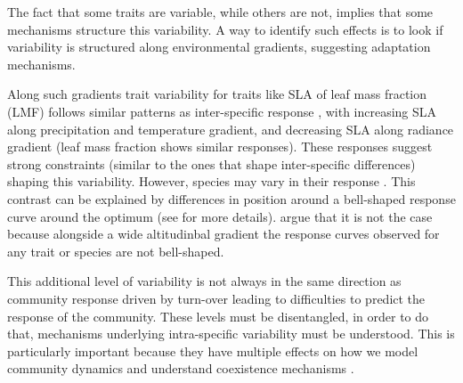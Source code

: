 {%




The fact that some traits are variable, while others are not, implies that some mechanisms structure this variability.
A way to identify such effects is to look if variability is structured along environmental gradients, suggesting adaptation mechanisms.

Along such gradients trait variability for traits like SLA \parencite{poorter_causes_2009} of leaf mass fraction (LMF) \parencite{poorter_biomass_2012} follows similar patterns as inter-specific response \parencite{niinemets_global-scale_2001}, with increasing SLA along precipitation and temperature gradient, and decreasing SLA along radiance gradient (leaf mass fraction shows similar responses). These responses suggest strong constraints (similar to the ones that shape inter-specific differences) shaping this variability. However, species may vary in their response \parencite{kichenin_contrasting_2013}. This contrast can be explained by differences in position around a bell-shaped response curve around the optimum (see \cite{albert_intraspecific_2010} for more details). \cite{kichenin_contrasting_2013} argue that it is not the case because alongside a wide altitudinbal gradient the response curves observed for any trait or species are not bell-shaped.

This additional level of variability is not always in the same direction as community response driven by turn-over \parencite{albert_intraspecific_2010, kichenin_contrasting_2013, jung_intraspecific_2014} leading to difficulties to predict the response of the community. These levels must be disentangled, in order to do that, mechanisms underlying intra-specific variability must be understood. This is particularly important because they have multiple effects on how we model community dynamics and understand coexistence mechanisms \cite{bolnick_why_2011, violle_return_2012}.
%
%
%
%

}
